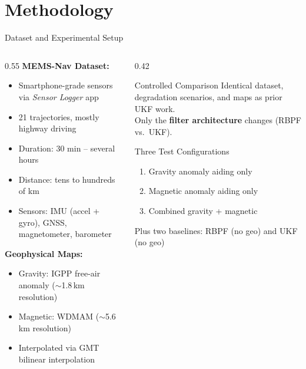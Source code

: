 \documentclass[aspectratio=169]{beamer}
\begin{document}
\section{Methodology}

\begin{frame}{Dataset and Experimental Setup}
    \begin{columns}
        \begin{column}{0.55\textwidth}
            \textbf{MEMS-Nav Dataset:}
            \begin{itemize}
                \item Smartphone-grade sensors via \emph{Sensor Logger} app
                \item 21 trajectories, mostly highway driving
                \item Duration: 30 min -- several hours
                \item Distance: tens to hundreds of km
                \item Sensors: IMU (accel + gyro), GNSS, magnetometer, barometer
            \end{itemize}
            \vspace{0.5em}
            \textbf{Geophysical Maps:}
            \begin{itemize}
                \item Gravity: IGPP free-air anomaly ($\sim$1.8\,km resolution)
                \item Magnetic: WDMAM ($\sim$5.6\,km resolution)
                \item Interpolated via GMT bilinear interpolation
            \end{itemize}
        \end{column}
        \begin{column}{0.42\textwidth}
            \begin{block}{Controlled Comparison}
                \small
                Identical dataset, degradation scenarios, and maps as prior UKF work.\\[0.5em]
                Only the \textbf{filter architecture} changes (RBPF vs.\ UKF).
            \end{block}
            \vspace{0.5em}
            \begin{block}{Three Test Configurations}
                \small
                \begin{enumerate}
                    \item Gravity anomaly aiding only
                    \item Magnetic anomaly aiding only
                    \item Combined gravity + magnetic
                \end{enumerate}
                \vspace{0.2em}
                Plus two baselines: RBPF (no geo) and UKF (no geo)
            \end{block}
        \end{column}
    \end{columns}
\end{frame}
\end{document}
